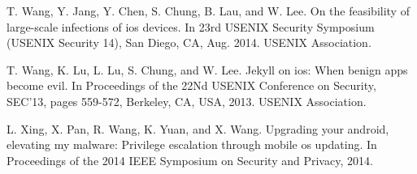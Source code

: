 \documentclass{article}
\begin{document}
\begin{thebibliography}{100}
T. Wang, Y. Jang, Y. Chen, S. Chung, B. Lau, and
W. Lee. On the feasibility of large-scale infections of
ios devices. In 23rd USENIX Security Symposium
(USENIX Security 14), San Diego, CA, Aug. 2014.
USENIX Association.

T. Wang, K. Lu, L. Lu, S. Chung, and W. Lee. Jekyll
on ios: When benign apps become evil. In Proceedings
of the 22Nd USENIX Conference on Security, SEC'13,
pages 559-572, Berkeley, CA, USA, 2013. USENIX
Association.

L. Xing, X. Pan, R. Wang, K. Yuan, and X. Wang.
Upgrading your android, elevating my malware:
Privilege escalation through mobile os updating. In
Proceedings of the 2014 IEEE Symposium on Security
and Privacy, 2014.

\end{thebibliography}
\end{document}

